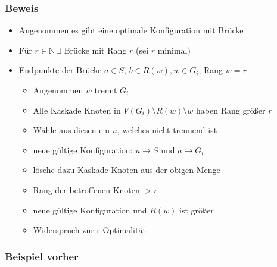 \documentclass{beamer}
\newcommand{\nn}{\mathbb{N}}
\theoremstyle{definition}
\theoremstyle{plain}
\begin{document}
\begin{frame}
\frametitle{Beweis}
\begin{itemize}[<+->]
    \item Angenommen es gibt eine optimale Konfiguration mit Brücke
    \item Für $r\in\nn~\exists$ Brücke mit Rang $r$ (sei $r$ minimal)
    \item Endpunkte der Brücke $a\in S$, $b\in R(w),w\in G_i$, Rang $w=r$
    \begin{itemize}[<+->]
        \item Angenommen $w$ trennt $G_i$
        \item Alle Kaskade Knoten in $V(G_i)\setminus R(w)\setminus w$ haben Rang größer $r$
        \item Wähle aus diesen ein $u$, welches nicht-trennend ist
        \item neue gültige Konfiguration: $u\rightarrow S$ und $a\rightarrow G_i$ 
        \item lösche dazu Kaskade Knoten aus der obigen Menge
        \item Rang der betroffenen Knoten $>r$
        \item neue gültige Konfiguration und $R(w)$ ist größer 
        \item Widerspruch zur r-Optimalität
    \end{itemize}
\end{itemize}
\end{frame}
\begin{frame}
    \frametitle{Beispiel vorher}
    \begin{figure}
    \end{figure}
\end{frame}
\end{document}
